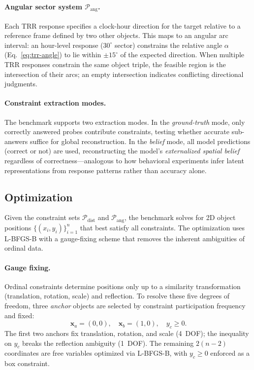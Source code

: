 \paragraph{Angular sector system $\mathcal{P}_{\mathrm{ang}}$.}
Each TRR response specifies a clock-hour direction for the target relative to a reference frame defined by two other objects. This maps to an angular arc interval: an hour-level response ($30^\circ$ sector) constrains the relative angle $\alpha$ (Eq.~\ref{eq:trr-angle}) to lie within $\pm 15^\circ$ of the expected direction. When multiple TRR responses constrain the same object triple, the feasible region is the intersection of their arcs; an empty intersection indicates conflicting directional judgments.

\paragraph{Constraint extraction modes.}
The benchmark supports two extraction modes. In the \emph{ground-truth} mode, only correctly answered probes contribute constraints, testing whether accurate sub-answers suffice for global reconstruction. In the \emph{belief} mode, all model predictions (correct or not) are used, reconstructing the model's \emph{externalized spatial belief} regardless of correctness---analogous to how behavioral experiments infer latent representations from response patterns rather than accuracy alone.

\subsection{Optimization}
\label{sec:optimization}

Given the constraint sets $\mathcal{P}_{\mathrm{dist}}$ and $\mathcal{P}_{\mathrm{ang}}$, the benchmark solves for 2D object positions $\{(x_i, y_i)\}_{i=1}^{n}$ that best satisfy all constraints. The optimization uses L-BFGS-B with a gauge-fixing scheme that removes the inherent ambiguities of ordinal data.

\paragraph{Gauge fixing.}
Ordinal constraints determine positions only up to a similarity transformation (translation, rotation, scale) and reflection. To resolve these five degrees of freedom, three \emph{anchor} objects are selected by constraint participation frequency and fixed:
\begin{equation}
  \mathbf{x}_a = (0, 0), \quad \mathbf{x}_b = (1, 0), \quad y_c \geq 0.
  \label{eq:gauge}
\end{equation}
The first two anchors fix translation, rotation, and scale (4~DOF); the inequality on $y_c$ breaks the reflection ambiguity (1~DOF). The remaining $2(n{-}2)$ coordinates are free variables optimized via L-BFGS-B, with $y_c \geq 0$ enforced as a box constraint.

